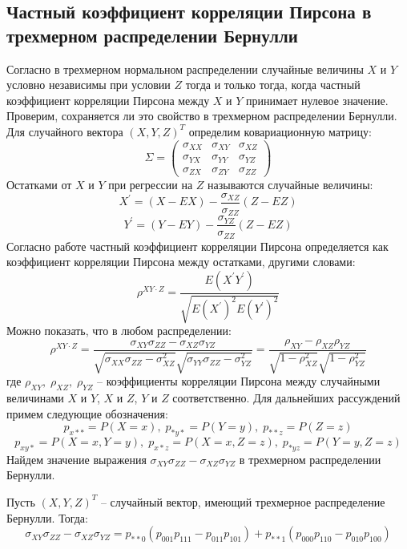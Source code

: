 \begin{centering}
    \subsection{Частный коэффициент корреляции Пирсона в трехмерном распределении Бернулли}\label{partial_section}
\end{centering}
Согласно \cite{Anderson2003} в трехмерном нормальном распределении случайные величины 
$X$ и $Y$ условно независимы при условии $Z$ тогда и только тогда, когда частный коэффициент корреляции Пирсона
между $X$ и $Y$ принимает нулевое значение.
Проверим, сохраняется ли это свойство в трехмерном распределении Бернулли.
Для случайного вектора $(X,Y,Z)^T$ определим ковариационную матрицу:
$$\Sigma =
    \begin{pmatrix}
        \sigma_{XX} & \sigma_{XY} & \sigma_{XZ} \\
        \sigma_{YX} & \sigma_{YY} & \sigma_{YZ} \\
        \sigma_{ZX} & \sigma_{ZY} & \sigma_{ZZ}
    \end{pmatrix}
$$
Остатками от $X$ и $Y$ при регрессии на $Z$ называются случайные величины:
$$
X^{\prime}=(X-EX)-\dfrac{\sigma_{XZ}}{\sigma_{ZZ}}(Z-EZ)
$$
$$
Y^{\prime}=(Y-EY)-\dfrac{\sigma_{YZ}}{\sigma_{ZZ}}(Z-EZ)
$$
Согласно работе \cite{Cramér1946} частный коэффициент корреляции Пирсона определяется как коэффициент
корреляции Пирсона между остатками, другими словами:
$$
\rho^{XY \cdot Z}=\dfrac{E(X^{\prime} Y^{\prime})}{\sqrt{E(X^{\prime})^2 E(Y^{\prime})^2}}
$$
Можно показать, что в любом распределении:
$$
\rho^{XY \cdot Z}=\dfrac{\sigma_{XY} \sigma_{ZZ} - \sigma_{XZ} \sigma_{YZ}}{\sqrt{\sigma_{XX}\sigma_{ZZ}-
    \sigma_{XZ}^2}\sqrt{\sigma_{YY}\sigma_{ZZ}-\sigma_{YZ}^2}}=\dfrac{\rho_{XY}-\rho_{XZ}\rho_{YZ}}{\sqrt{1-\rho_{XZ}^2}\sqrt{1-\rho_{YZ}^2}}
$$
где $\rho_{XY}, \; \rho_{XZ}, \; \rho_{YZ}$ -- коэффициенты корреляции Пирсона
    между случайными величинами $X$ и $Y$, $X$ и $Z$, $Y$ и $Z$
    соответственно.
Для дальнейших рассуждений примем следующие обозначения: 
$$p_{x**}=P(X=x), \; p_{*y*}=P(Y=y), \; p_{**z}=P(Z=z)$$ 
$$  p_{xy*}=P(X=x, Y=y),\; p_{x*z}=P(X=x, Z=z), \; p_{*yz}=P(Y=y, Z=z)$$
Найдем значение выражения $\sigma_{XY} \sigma_{ZZ} - \sigma_{XZ} \sigma_{YZ}$ в трехмерном распределении Бернулли.
\begin{lemma}\label{partial_cov}
    Пусть $(X,Y,Z)^T$ -- случайный вектор, имеющий трехмерное распределение Бернулли. Тогда:
    $$\sigma_{XY} \sigma_{ZZ} - \sigma_{XZ} \sigma_{YZ} = p_{**0}(p_{001}p_{111}-p_{011}p_{101}) + p_{**1} (p_{000}p_{110}-p_{010}p_{100})$$
\end{lemma}
